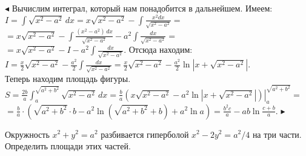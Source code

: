 \documentclass[a5paper,10pt]{article}
\begin{document}
\medskip
\noindent $\blacktriangleleft$ Вычислим интеграл, который нам понадобится
в дальнейшем. Имеем:\\
$\displaystyle I=\int\sqrt{x^2-a^2}\,dx=
x\sqrt{x^2-a^2}-\int\frac{x^2dx}{\sqrt{x^2-a^2}}=$\\
$\displaystyle =x\sqrt{x^2-a^2}-\int\frac{(x^2-a^2)\,dx}{\sqrt{x^2-a^2}}-a^2\int\frac{dx}{\sqrt{x^2-a^2}}=$\\
$\displaystyle =x\sqrt{x^2-a^2}-I-a^2\int\frac{dx}{\sqrt{x^2-a^2}}$. Отсюда находим:\\
$\displaystyle I=\frac x2\sqrt{x^2-a^2}-\frac{a^2}{2}\int\frac{dx}{\sqrt{x^2-a^2}}=
\frac x2\sqrt{x^2-a^2}-\frac{a^2}{2}\ln|x+\sqrt{x^2-a^2}|$.\\
Теперь находим площадь фигуры.\\
$\displaystyle S=\frac {2b}{a}\int_a^{\sqrt{a^2+b^2}}\sqrt{x^2-a^2}\,dx=
\frac{b}{a}\left.\left(x\sqrt{x^2-a^2}-a^2\ln|x+\sqrt{x^2-a^2}|\right )\right|_a^{\sqrt{a^2+b^2}}=$\\
$\displaystyle =\frac{b}{a}\cdot(\sqrt{a^2+b^2}\cdot b-a^2\ln(\sqrt{a^2+b^2}+b)+a^2\ln a)=
\frac{b^2c}{a}-ab\ln\frac{c+b}{a}$. $\blacktriangleright$

\medskip
{} Окружность $x^2+y^2=a^2$ разбивается гиперболой
$x^2-2y^2=a^2/4$ на три части. Определить площади этих частей.
\end{document}
